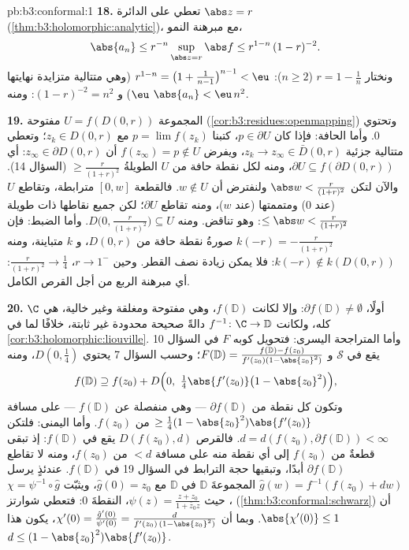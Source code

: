 \begin{solution}{pb:b3:conformal:1}
\textbf{18.} تعطي  على الدائرة $\abs z =
r$
(\cref{thm:b3:holomorphic:analytic})، مع مبرهنة النمو،
\[
\abs{a_n} \leq r^{-n}\sup_{\abs z = r}\abs f
\leq r^{1-n}\,(1 - r)^{-2} .
\]
ونختار $r = 1 - \frac1n$ ($n \geq
2$): $r^{1-n} = \bigl(1 + \frac1{n-1}\bigr)^{n-1} < \eu$ (وهي متتالية متزايدة نهايتها
$\eu$) و $(1 - r)^{-2} =
n^2$: ومنه $\abs{a_n} < \eu\,n^2$.

\textbf{19.} المجموعة $U = f(D(0, r))$ مفتوحة (\cref{cor:b3:residues:openmapping})
وتحتوي $0$. وأما الحافة: فإذا كان $p \in \partial U$، كتبنا $p = \lim f(z_k)$ مع
$z_k \in D(0, r)$؛ وتعطي متتالية جزئية $z_k \to z_\infty
\in \bar D(0, r)$، ويفرض $f(z_\infty) = p \notin U$ أن $z_\infty \in \partial D(0, r)$:
أي $\partial U \subseteq
f(\partial D(0, r))$، ومنه لكل نقطة حافة من $U$ الطويلةُ $\geq \frac r{(1+r)^2}$ (السؤال
14). والآن لتكن $\abs w < \frac r{(1+r)^2}$ ولنفترض أن $w \notin U$. فالقطعة
$[0, w]$ مترابطة، وتقاطع $U$ (عند $0$) ومتممتها (عند $w$)،
ومنه تقاطع $\partial U$؛ لكن جميع نقاطها ذات طويلة $\leq \abs w < \frac r{(1+r)^2}$:
وهو تناقض. ومنه $D\bigl(0, \frac r{(1+r)^2}\bigr)
\subseteq U$. وأما الضبط: فإن $k(-r) = -\frac r{(1+r)^2}$ صورةُ نقطة
حافة من $D(0,r)$، و $k$ متباينة، ومنه $k(-r) \notin k(D(0, r))$: فلا يمكن زيادة
نصف القطر. وحين $r \to 1^-$، $\frac r{(1+r)^2} \to \frac14$: أي مبرهنة الربع من أجل
القرص الكامل.

\textbf{20.} أولًا، $\partial f(\mathbb D) \neq \emptyset$: وإلا لكانت $f(\mathbb D)$، وهي
مفتوحة ومغلقة وغير خالية، هي $\C$ كله، ولكانت $f^{-1} \colon \C \to \mathbb D$ دالةً
صحيحة محدودة غير ثابتة، خلافًا لما في \cref{cor:b3:holomorphic:liouville}. وأما المتراجحة
اليسرى: فتحويل كوبه $F$ في السؤال 10 يقع في $\mathcal S$
و $F(\mathbb D) = \frac{f(\mathbb D) -
f(z_0)}{f'(z_0)(1-\abs{z_0}^2)}$؛ وحسب السؤال 7 يحتوي $D(0, \frac14)$، ومنه
\[
f(\mathbb D) \supseteq f(z_0) + D\Bigl(0,\
\tfrac14\abs{f'(z_0)}\bigl(1 - \abs{z_0}^2\bigr)\Bigr) ,
\]
وتكون كل نقطة من $\partial f(\mathbb D)$ --- وهي منفصلة عن 
$f(\mathbb D)$ --- على مسافة $\geq
\frac14(1-\abs{z_0}^2)\abs{f'(z_0)}$ من $f(z_0)$. وأما اليمنى:
فلتكن $d = d(f(z_0), \partial f(\mathbb D)) <
\infty$. فالقرص $D(f(z_0), d)$ يقع في $f(\mathbb D)$: إذ
تبقى قطعةٌ من $f(z_0)$ إلى أي نقطة منه على مسافة $< d$ من
$f(z_0)$، ومنه لا تقاطع $\partial f(\mathbb D)$ أبدًا، وتبقيها حجة الترابط في
السؤال 19 في $f(\mathbb D)$. عندئذٍ يرسل $\hat g(w) = f^{-1}(f(z_0) + dw)$ المجموعةَ
$\mathbb D$ في $\mathbb D$ مع $\hat g(0) = z_0$، ويثبّت $\chi = \psi^{-1}\circ\hat g$، حيث
$\psi(z) = \frac{z +
z_0}{1 + \bar z_0z}$، النقطةَ $0$: فتعطي شوارتز (\cref{thm:b3:conformal:schwarz}) أن $\abs{\chi'(0)}
\leq 1$.
وبما أن $\chi'(0) = \frac{\hat g'(0)}{\psi'(0)} =
\frac{d}{f'(z_0)\,(1 - \abs{z_0}^2)}$، يكون هذا $d \leq (1 -
\abs{z_0}^2)\abs{f'(z_0)}$.


\end{solution}
